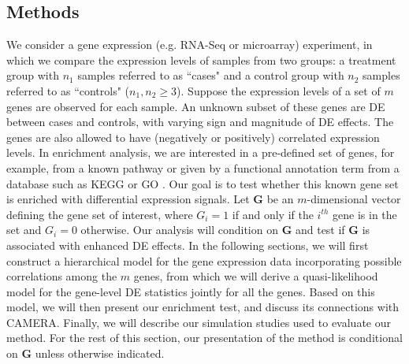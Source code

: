 	\subsection{Methods}\label{section:methods}
	We consider a gene expression (e.g. RNA-Seq or microarray) experiment, in which we compare the 
	expression levels of samples from two groups: a treatment group with $n_1$ samples referred to 
	as
	``cases" and a control group with $n_2$ samples referred to as ``controls" ($n_1,n_2\ge 3$). 
	Suppose
	the expression levels of a set of $m$ genes are observed for each sample. An unknown subset of
	these genes are DE between cases and controls, with varying sign and magnitude of DE effects. 
	The
	genes are also allowed to have (negatively or positively) correlated expression levels. In
	enrichment analysis, we are interested in a pre-defined set of genes, for example, from a known
	pathway or given by a functional annotation term from a database such as KEGG
	\citep{kanehisa2000kegg} or GO \citep{ashburner2000gene}. Our goal is to test whether this known
	gene set is enriched with differential expression signals. Let $\bm G$ be an $m$-dimensional 
	vector
	defining the gene set of interest, where $G_i=1$ if and only if the $i^{th}$ gene is in the set 
	and
	$G_i=0$ otherwise. Our analysis will condition on $\bm G$ and test if $\bm G$ is associated with
	enhanced DE effects. In the following sections, we will first construct a hierarchical model 
	for the
	gene expression data incorporating possible correlations among the $m$ genes, from which we will
	derive a quasi-likelihood model for the gene-level DE statistics jointly for all the genes. 
	Based on
	this model, we will then present our enrichment test, and discuss its connections with CAMERA.
	Finally, we will describe our simulation studies used to evaluate our method. For the rest of
	this section, our presentation of the method is conditional on $\bm G$ unless otherwise
	indicated.
	
	\subsubsection{\OurMethod}
